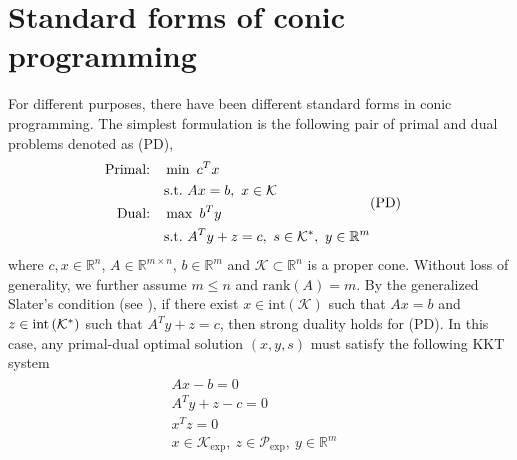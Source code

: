 \documentclass[10pt]{article}
\theoremstyle{definition}
\theoremstyle{plain}
\def\interior{\protect{\textnormal{int}}}
\begin{document}
\section{Standard forms of conic programming}
For different purposes, there have been different standard forms in conic programming. The simplest formulation is the following pair of primal and dual problems denoted as (PD), 
\begin{align}
\begin{split} 
\text{Primal:} \quad &\min\,\, c^Tx\\ 
&\textnormal{s.t.} \,\, Ax=b,\ x\in \mathcal{K} \\
\text{Dual:}  \quad &\max\,\, b^Ty \\
&\textnormal{s.t.} \,\, A^Ty+z=c,\ s\in\mathcal{K}^*,\ y \in \mathbb{R}^m \\
\end{split} &\text{(PD)} \nonumber
\end{align}
where $c,x \in \mathbb{R}^n$, $A\in \mathbb{R}^{m\times n}$, $b\in \mathbb{R}^m$ and $\mathcal{K} \subset \mathbb{R}^n$ is a proper cone. Without loss of generality, we further assume $m\leq n$ and $\text{rank}(A) = m$. By the generalized Slater's condition (see \cite{Boyd_Vander_Convex_Opt_Book}), if there exist
$x \in \text{int} \left(\mathcal{K}\right)$ such that $Ax=b$ and $z \in \interior \left(\mathcal{K}^*\right)$ such that $A^Ty+z=c$,
then strong duality holds for (PD). In this case, any primal-dual optimal solution $(x,y,s)$ must satisfy the following KKT system
\begin{align}\label{KKT_for_PD}
\begin{split}
Ax-b=0& \\
A^Ty+z-c=0& \\
x^Tz=0& \\
x\in\mathcal{K}_{\exp},\ z\in\mathcal{P}_{\exp},\ y\in\mathbb{R}^m& 
\end{split}
\end{align}
\end{document}
